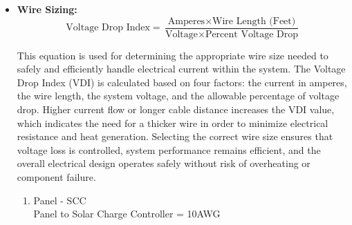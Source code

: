 {\begin{itemize}
\begin{enumerate}[label=\alph*.]
 		\item Inverter - Load (AC Breaker)
 		\begin{equation}
 			\text{Circuit Breaker} = \frac{ \text{Safety Load}}{\text{Inverter Voltage Output}} \times \text{BBNV}
 		\end{equation}
 		
 		
 		This equation sizes the AC circuit breaker located between the inverter and the connected load. The Safety Load represents the maximum expected power consumption of the AC appliances connected to the inverter. Dividing this value by the inverter’s AC output voltage converts the load into current, representing the expected amperage during operation. The result is then multiplied by the battery bank nominal voltage to account for conversion losses and variations in real operating conditions.
 		Based on the system values used in the computation, the required AC breaker rating is 4A, which provides sufficient protection by interrupting excessive current that could damage connected appliances or the inverter output circuitry. This calculated breaker size ensures safe and reliable system performance under normal and peak load operations. Please refer to \hyperref[appendix:A]{Appendix A} for the detailed computation.
 		
 	\end{enumerate}
 	
 	\item \textbf{Wire Sizing:} 
 	\begin{equation}
 		\text{Voltage Drop Index} = \frac{\text{Amperes} \times \text{Wire Length (Feet)}}{\text{Voltage} \times \text{Percent Voltage Drop}}
 	\end{equation}
 	
 	
 	This equation is used for determining the appropriate wire size needed to safely and efficiently handle electrical current within the system. The Voltage Drop Index (VDI) is calculated based on four factors: the current in amperes, the wire length, the system voltage, and the allowable percentage of voltage drop. Higher current flow or longer cable distance increases the VDI value, which indicates the need for a thicker wire in order to minimize electrical resistance and heat generation. Selecting the correct wire size ensures that voltage loss is controlled, system performance remains efficient, and the overall electrical design operates safely without risk of overheating or component failure.
 	
 	\begin{enumerate}[label=\alph*.]
 		\item Panel - SCC \\
 		Panel to Solar Charge Controller = 10AWG 
 		

\end{enumerate}
\end{itemize}}
